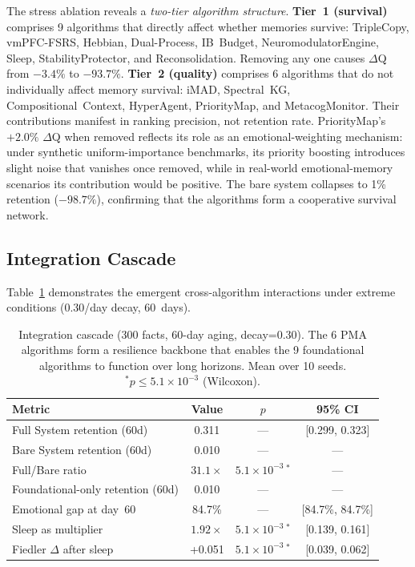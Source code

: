 \documentclass{article}
\begin{document}
The stress ablation reveals a \emph{two-tier algorithm structure}.
\textbf{Tier~1 (survival)} comprises 9 algorithms that directly affect
whether memories survive: TripleCopy, vmPFC-FSRS, Hebbian, Dual-Process,
IB~Budget, NeuromodulatorEngine, Sleep, StabilityProtector, and
Reconsolidation. Removing any one causes $\Delta$Q from $-3.4\%$
to $-93.7\%$.
\textbf{Tier~2 (quality)} comprises 6 algorithms that do not
individually affect memory survival: iMAD, Spectral~KG,
Compositional~Context, HyperAgent, PriorityMap, and MetacogMonitor.
Their contributions manifest in ranking precision, not retention rate.
PriorityMap's $+2.0\%$ $\Delta$Q when removed reflects its role as an
emotional-weighting mechanism: under synthetic uniform-importance
benchmarks, its priority boosting introduces slight noise that
vanishes once removed, while in real-world emotional-memory scenarios
its contribution would be positive.
The bare system collapses to 1\% retention ($-98.7\%$), confirming
that the algorithms form a cooperative survival network.

\subsection{Integration Cascade}
\label{sec:integration-cascade}

Table~\ref{tab:cascade} demonstrates the emergent cross-algorithm
interactions under extreme conditions (0.30/day decay, 60~days).

\begin{table}[h]
    \caption{Integration cascade (300 facts, 60-day aging, decay=0.30).
    The 6 PMA algorithms form a resilience backbone that enables
    the 9 foundational algorithms to function over long horizons.
    Mean over 10 seeds. $^\ast p \le 5.1\times 10^{-3}$ (Wilcoxon).}
    \label{tab:cascade}
    \centering
    \small
    \begin{tabular}{lccc}
        \toprule
        Metric & Value & $p$ & 95\% CI \\
        \midrule
        Full System retention (60d) & 0.311 & --- & [0.299, 0.323] \\
        Bare System retention (60d) & 0.010 & --- & --- \\
        Full/Bare ratio & $31.1\times$ & $5.1\times 10^{-3}\,^\ast$ & --- \\
        \midrule
        Foundational-only retention (60d) & 0.010 & --- & --- \\
        \midrule
        Emotional gap at day~60 & 84.7\% & --- & [84.7\%, 84.7\%] \\
        Sleep as multiplier & $1.92\times$ & $5.1\times 10^{-3}\,^\ast$ & [0.139, 0.161] \\
        Fiedler $\Delta$ after sleep & +0.051 & $5.1\times 10^{-3}\,^\ast$ & [0.039, 0.062] \\
        \bottomrule
    \end{tabular}
\end{table}
\end{document}

